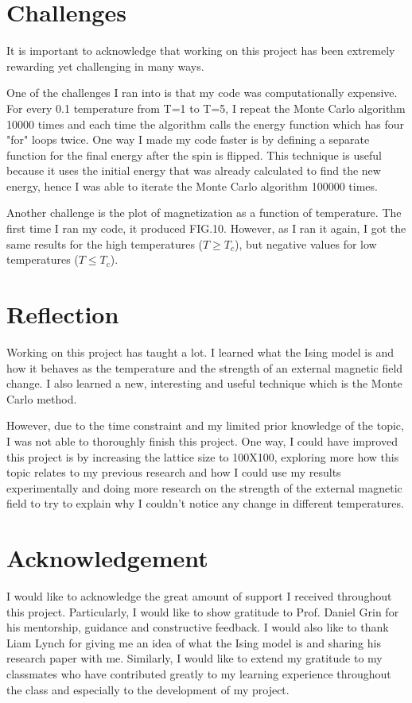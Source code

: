 \documentclass[aps,twocolumn,twoside,secnumarabic,balancelastpage,amsmath,amssymb,nofootinbib,hyperref=pdftex]{revtex4}
\begin{document}
\section{Challenges}
\par It is important to acknowledge that working on this project has been extremely rewarding yet challenging in many ways. 
\par One of the challenges I ran into is that my code was computationally expensive. For every 0.1 temperature from T=1 to T=5, I repeat the Monte Carlo algorithm 10000 times and each time the algorithm calls the energy function which has four "for" loops twice. One way I made my code faster is by defining a separate function for the final energy after the spin is flipped. This technique is useful because it uses the initial energy that was already calculated to find the new energy, hence I was able to iterate the Monte Carlo algorithm 100000 times.
\par Another challenge is the plot of magnetization as a function of temperature. The first time I ran my code, it produced FIG.10. However, as I ran it again, I got the same results for the high temperatures ($T \geqslant T_c$), but negative values for low temperatures ($T \leqslant T_c$). 



\section{Reflection}
\par Working on this project has taught a lot. I learned what the Ising model is and how it behaves as the temperature and the strength of an external magnetic field change. I also learned a new, interesting and useful technique which is the Monte Carlo method. 
\par However, due to the time constraint and my limited prior knowledge of the topic, I was not able to thoroughly finish this project. One way, I could have improved this project is by increasing the lattice size to 100X100, exploring more how this topic relates to my previous research and how I could use my results experimentally and doing more research on the strength of the external magnetic field to try to explain why I couldn't notice any change in different temperatures.



 
\nocite{Cipra}
\nocite{Debashish}
\nocite{a}
\nocite{b}
\nocite{c}
\nocite{d}
 
\section*{Acknowledgement}
I would like to acknowledge the great amount of support I received throughout this project. Particularly, I would like to show gratitude to Prof. Daniel Grin for his mentorship, guidance and constructive feedback. I would also like to thank Liam Lynch for giving me an idea of what the Ising model is and sharing his research paper with me. Similarly, I would like to extend my gratitude to my classmates who have contributed greatly to my learning experience throughout the class and especially to the development of my project. 
\end{document}
